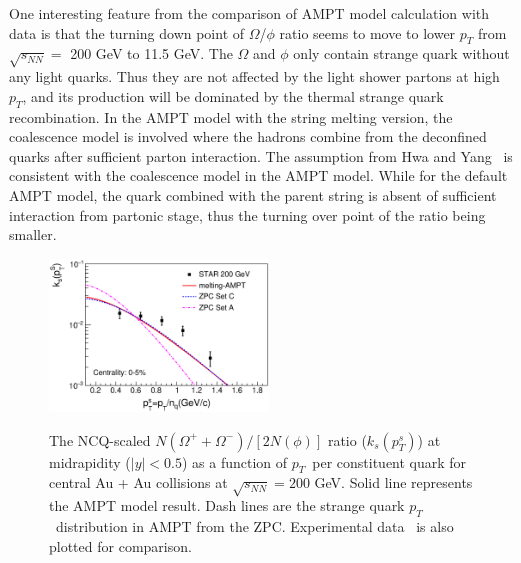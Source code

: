 \documentclass[twocolumn,aps,prc,showpacs,superscriptaddress,preprintnumbers,floatfix,nofootinbib]{revtex4}
\newcommand{ \pt } {${p_{T}}$}
\begin{document}
\begin{CJK*}{GBK}{song}
One interesting feature from the comparison of AMPT model calculation with data is that the turning  down point of $\Omega$/$\phi$ ratio seems to move to lower $p_T$ from $\sqrt{s_{NN}}=$ 200 GeV to 11.5 GeV. The $\Omega$ and $\phi$ only contain strange quark without any light quarks. Thus they are not affected by the light shower partons at high \pt, and its production will be dominated by the thermal strange quark recombination. In the AMPT model with the string melting version, the coalescence model is involved where the hadrons combine from the deconfined quarks after sufficient parton interaction. The assumption from Hwa and Yang~\cite{ratio} is consistent with the coalescence model in the AMPT model. While for the default AMPT model, the quark combined with the parent string is absent of sufficient interaction from partonic stage, thus the turning over point of the ratio being smaller.


    \begin{figure}[htbp]
      \includegraphics[width=0.52\textwidth]{Fig4_zpc.eps}\\
      \caption{The NCQ-scaled $N(\Omega ^++\Omega^-)/[2N(\phi)]$ ratio ($k_{s}(p_{T}^{s})$)  at midrapidity ($|y|<0.5$) as a function of \pt~per constituent quark for central Au + Au collisions at $\sqrt{s_{NN}} = 200$ GeV. Solid line represents the AMPT model result. Dash lines are the strange quark \pt~distribution in AMPT from the ZPC. Experimental data~\cite{OmegaphiSTAR} is also plotted for comparison.}
      \label{zpc}
    \end{figure}


\end{CJK*}
\end{document}
